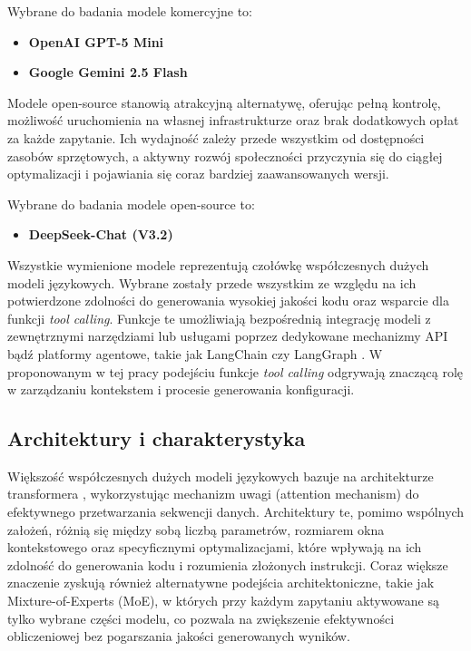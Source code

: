 Wybrane do badania modele komercyjne to:

\begin{itemize}
    \item \textbf{OpenAI GPT-5 Mini} \cite{gpt5mini}
    \item \textbf{Google Gemini 2.5 Flash} \cite{gemini25_flash}
\end{itemize}

Modele open-source stanowią atrakcyjną alternatywę, oferując pełną kontrolę, możliwość uruchomienia na własnej infrastrukturze oraz brak dodatkowych opłat za każde zapytanie. Ich wydajność zależy przede wszystkim od dostępności zasobów sprzętowych, a aktywny rozwój społeczności przyczynia się do ciągłej optymalizacji i pojawiania się coraz bardziej zaawansowanych wersji.

Wybrane do badania modele open-source to:

\begin{itemize}
    \item \textbf{DeepSeek-Chat (V3.2)} \cite{deepseek_v32}
\end{itemize}

Wszystkie wymienione modele reprezentują czołówkę współczesnych dużych modeli językowych. Wybrane zostały przede wszystkim ze względu na ich potwierdzone zdolności do generowania wysokiej jakości kodu oraz wsparcie dla funkcji \textit{tool calling}. Funkcje te umożliwiają bezpośrednią integrację modeli z zewnętrznymi narzędziami lub usługami poprzez dedykowane mechanizmy API bądź platformy agentowe, takie jak LangChain \cite{langchain} czy LangGraph \cite{langgraph}. W proponowanym w tej pracy podejściu funkcje \textit{tool calling} odgrywają znaczącą rolę w zarządzaniu kontekstem i procesie generowania konfiguracji.

\subsection{Architektury i charakterystyka}

Większość współczesnych dużych modeli językowych bazuje na architekturze transformera \cite{vaswani_attention_2023}, wykorzystując mechanizm uwagi (attention mechanism) do efektywnego przetwarzania sekwencji danych. Architektury te, pomimo wspólnych założeń, różnią się między sobą liczbą parametrów, rozmiarem okna kontekstowego oraz specyficznymi optymalizacjami, które wpływają na ich zdolność do generowania kodu i rozumienia złożonych instrukcji. Coraz większe znaczenie zyskują również alternatywne podejścia architektoniczne, takie jak Mixture-of-Experts (MoE), w których przy każdym zapytaniu aktywowane są tylko wybrane części modelu, co pozwala na zwiększenie efektywności obliczeniowej bez pogarszania jakości generowanych wyników.

